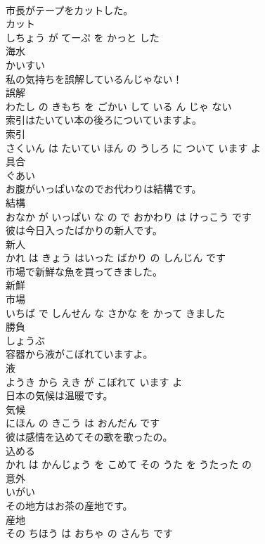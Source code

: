 \documentclass[8pt]{extreport}
\begin{document}
\begin{CJK}{UTF8}{min}
\\	市長がテープをカットした。	
\\	カット 
\\	しちょう が てーぷ を かっと した			
\\	海水	
\\	かいすい			
\\	私の気持ちを誤解しているんじゃない！	
\\	誤解 
\\	わたし の きもち を ごかい して いる ん じゃ ない			
\\	索引はたいてい本の後ろについていますよ。	
\\	索引 
\\	さくいん は たいてい ほん の うしろ に ついて います よ			
\\	具合	
\\	ぐあい			
\\	お腹がいっぱいなのでお代わりは結構です。	
\\	結構 
\\	おなか が いっぱい な の で おかわり は けっこう です			
\\	彼は今日入ったばかりの新人です。	
\\	新人 
\\	かれ は きょう はいった ばかり の しんじん です			
\\	市場で新鮮な魚を買ってきました。	
\\	新鮮 
\\	市場 
\\	いちば で しんせん な さかな を かって きました			
\\	勝負	
\\	しょうぶ			
\\	容器から液がこぼれていますよ。	
\\	液 
\\	ようき から えき が こぼれて います よ			
\\	日本の気候は温暖です。	
\\	気候 
\\	にほん の きこう は おんだん です			
\\	彼は感情を込めてその歌を歌ったの。	
\\	込める 
\\	かれ は かんじょう を こめて その うた を うたった の			
\\	意外	
\\	いがい			
\\	その地方はお茶の産地です。	
\\	産地 
\\	その ちほう は おちゃ の さんち です			

\end{CJK}
\end{document}

